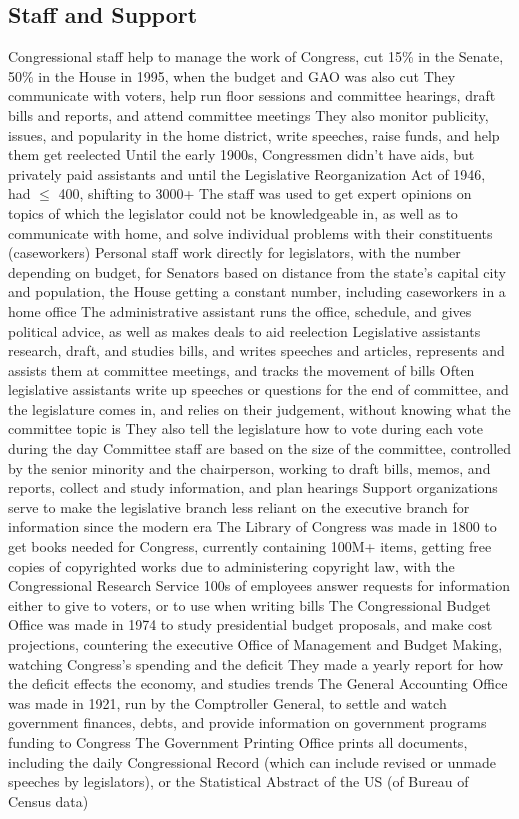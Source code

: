 \documentclass[11 pt, twoside]{article}
\newenvironment{outline*}
{
	\begin{outline}[enumerate]
	}
	{\end{outline}
}
\begin{document}
\subsection{Staff and Support}
\begin{outline*}
\1 Congressional staff help to manage the work of Congress, cut 15\% in the Senate, 50\% in the House in 1995, when the budget and GAO was also cut
\2 They communicate with voters, help run floor sessions and committee hearings, draft bills and reports, and attend committee meetings
\2 They also monitor publicity, issues, and popularity in the home district, write speeches, raise funds, and help them get reelected
\1 Until the early 1900s, Congressmen didn’t have aids, but privately paid assistants and until the Legislative Reorganization Act of 1946, had $\leq$ 400, shifting to 3000+
\2 The staff was used to get expert opinions on topics of which the legislator could not be knowledgeable in, as well as to communicate with home, and solve individual problems with their constituents (caseworkers)
\1 Personal staff work directly for legislators, with the number depending on budget, for Senators based on distance from the state’s capital city and population, the House getting a constant number, including caseworkers in a home office
\2 The administrative assistant runs the office, schedule, and gives political advice, as well as makes deals to aid reelection
\2 Legislative assistants research, draft, and studies bills, and writes speeches and articles, represents and assists them at committee meetings, and tracks the movement of bills
\2 Often legislative assistants write up speeches or questions for the end of committee, and the legislature comes in, and relies on their judgement, without knowing what the committee topic is
\2 They also tell the legislature how to vote during each vote during the day
\1 Committee staff are based on the size of the committee, controlled by the senior minority and the chairperson, working to draft bills, memos, and reports, collect and study information, and plan hearings
\1 Support organizations serve to make the legislative branch less reliant on the executive branch for information since the modern era
\1 The Library of Congress was made in 1800 to get books needed for Congress, currently containing 100M+ items, getting free copies of copyrighted works due to administering copyright law, with the Congressional Research Service
\2 100s of employees answer requests for information either to give to voters, or to use when writing bills
\1 The Congressional Budget Office was made in 1974 to study presidential budget proposals, and make cost projections, countering the executive Office of Management and Budget Making, watching Congress’s spending and the deficit
\2 They made a yearly report for how the deficit effects the economy, and studies trends
\1 The General Accounting Office was made in 1921, run by the Comptroller General, to settle and watch government finances, debts, and provide information on government programs funding to Congress
\1 The Government Printing Office prints all documents, including the daily Congressional Record (which can include revised or unmade speeches by legislators), or the Statistical Abstract of the US (of Bureau of Census data)
\end{outline*}
\end{document}
